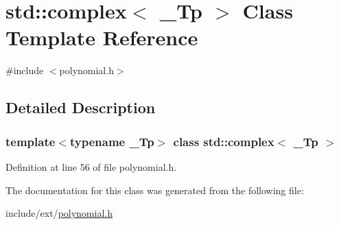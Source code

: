 \hypertarget{classstd_1_1complex}{}\section{std\+:\+:complex$<$ \+\_\+\+Tp $>$ Class Template Reference}
\label{classstd_1_1complex}


{\ttfamily \#include $<$polynomial.\+h$>$}



\subsection{Detailed Description}
\subsubsection*{template$<$typename \+\_\+\+Tp$>$\newline
class std\+::complex$<$ \+\_\+\+Tp $>$}



Definition at line 56 of file polynomial.\+h.



The documentation for this class was generated from the following file\+:\begin{DoxyCompactItemize}
\item 
include/ext/\hyperlink{polynomial_8h}{polynomial.\+h}\end{DoxyCompactItemize}
